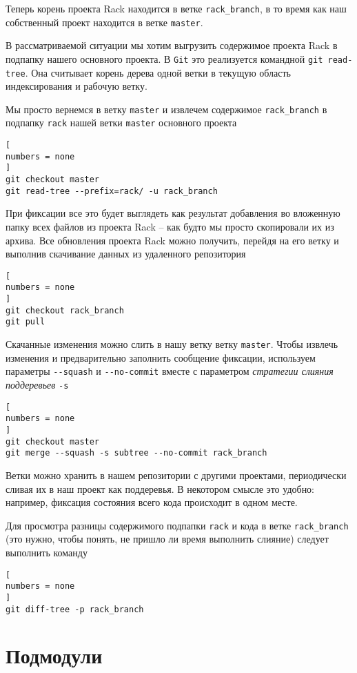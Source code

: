 \documentclass[%
	11pt,
	a4paper,
	utf8,
		]{article}
\begin{document}
Теперь корень проекта Rack находится в ветке \texttt{rack\_branch}, в то время как наш собственный проект находится в ветке \texttt{master}.

В рассматриваемой ситуации мы хотим выгрузить содержимое проекта Rack в подпапку нашего основного проекта. В \texttt{Git} это реализуется командной \texttt{git read-tree}. Она считывает корень дерева одной ветки в текущую область индексирования и рабочую ветку.

Мы просто вернемся в ветку \texttt{master} и извлечем содержимое \texttt{rack\_branch} в подпапку \texttt{rack} нашей ветки \texttt{master} основного проекта
\begin{lstlisting}[
numbers = none
]
git checkout master
git read-tree --prefix=rack/ -u rack_branch
\end{lstlisting}

При фиксации все это будет выглядеть как результат добавления во вложенную папку всех файлов из проекта Rack -- как будто мы просто скопировали их из архива. Все обновления проекта Rack можно получить, перейдя на его ветку и выполнив скачивание данных из удаленного репозитория
\begin{lstlisting}[
numbers = none
]
git checkout rack_branch
git pull
\end{lstlisting}

Скачанные изменения можно слить в нашу ветку ветку \texttt{master}. Чтобы извлечь изменения и предварительно заполнить сообщение фиксации, используем параметры \verb|--squash| и \verb|--no-commit| вместе с параметром \emph{стратегии слияния поддеревьев} \texttt{-s}
\begin{lstlisting}[
numbers = none
]
git checkout master
git merge --squash -s subtree --no-commit rack_branch
\end{lstlisting}

Ветки можно хранить в нашем репозитории с другими проектами, периодически сливая их в наш проект как поддеревья. В некотором смысле это удобно: например, фиксация состояния всего кода происходит в одном месте.

Для просмотра разницы содержимого подпапки \texttt{rack} и кода в ветке \texttt{rack\_branch} (это нужно, чтобы понять, не пришло ли время выполнить слияние) следует выполнить команду
\begin{lstlisting}[
numbers = none
]
git diff-tree -p rack_branch
\end{lstlisting}

\section{Подмодули}
\end{document}
